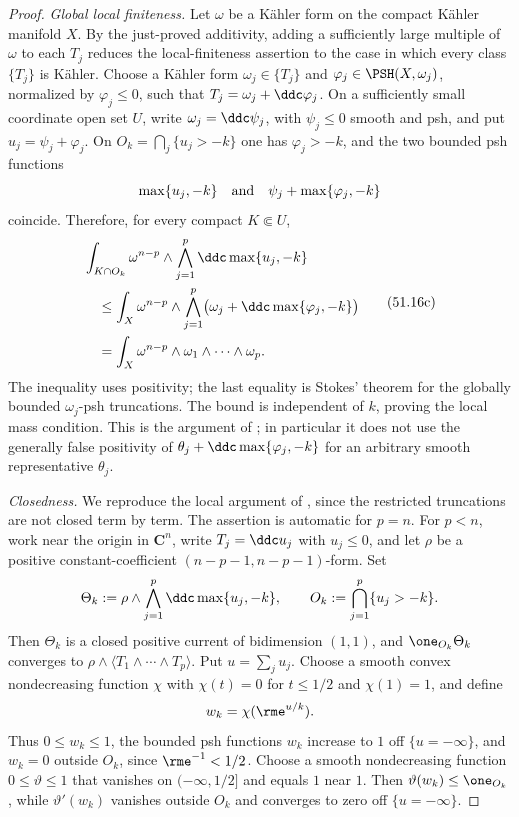 \begin{proof}
\emph{Global local finiteness.}
Let \(\omega\) be a K\"ahler form on the compact K\"ahler manifold \(X\).
By the just-proved additivity, adding a sufficiently large multiple of
\(\omega\) to each \(T_j\) reduces the local-finiteness assertion to the
case in which every class \(\{T_j\}\) is K\"ahler.  Choose a K\"ahler form
\(\omega_j\in\{T_j\}\) and
\(\varphi_j\in\PSH(X,\omega_j)\), normalized by \(\varphi_j\leq0\), such
that \(T_j=\omega_j+\ddc\varphi_j\).  On a sufficiently small coordinate
open set \(U\), write \(\omega_j=\ddc\psi_j\), with \(\psi_j\leq0\) smooth
and psh, and put \(u_j=\psi_j+\varphi_j\).  On
\(O_k=\bigcap_j\{u_j>-k\}\) one has \(\varphi_j>-k\), and the two bounded
psh functions
\[
       \max\{u_j,-k\}
       \quad\hbox{and}\quad
       \psi_j+\max\{\varphi_j,-k\}
\]
coincide.  Therefore, for every compact \(K\Subset U\),
\[
\begin{aligned}
 &\int_{K\cap O_k}\omega^{n-p}\wedge
       \bigwedge_{j=1}^p\ddc\max\{u_j,-k\}\\
 &\quad\leq
 \int_X\omega^{n-p}\wedge
       \bigwedge_{j=1}^p
          \bigl(\omega_j+\ddc\max\{\varphi_j,-k\}\bigr)\\
 &\quad=
 \int_X\omega^{n-p}\wedge\omega_1\wedge\cdots\wedge\omega_p.
\end{aligned}
\tag{51.16c}\label{eq:complex-npp-global-finiteness}
\]
The inequality uses positivity; the last equality is Stokes' theorem for
the globally bounded \(\omega_j\)-psh truncations.  The bound is independent
of \(k\), proving the local mass condition.  This is the argument of
\cite[Proposition~1.6]{BEGZ10}; in particular it does not use the generally
false positivity of
\(\theta_j+\ddc\max\{\varphi_j,-k\}\) for an arbitrary smooth
representative \(\theta_j\).

\emph{Closedness.}
We reproduce the local argument of \cite[Theorem~1.8]{BEGZ10}, since the
restricted truncations are not closed term by term.  The assertion is
automatic for \(p=n\).  For \(p<n\), work near the origin in
\(\mathbf C^n\), write \(T_j=\ddc u_j\) with \(u_j\leq0\), and let
\(\rho\) be a positive constant-coefficient
\((n-p-1,n-p-1)\)-form.  Set
\[
 \Theta_k:=\rho\wedge\bigwedge_{j=1}^p
                  \ddc\max\{u_j,-k\},
 \qquad O_k:=\bigcap_{j=1}^p\{u_j>-k\}.
\]
Then \(\Theta_k\) is a closed positive current of bidimension \((1,1)\),
and \(\one_{O_k}\Theta_k\) converges to
\(\rho\wedge\langle T_1\wedge\cdots\wedge T_p\rangle\).  Put
\(u=\sum_j u_j\).  Choose a smooth convex nondecreasing function \(\chi\)
with \(\chi(t)=0\) for \(t\leq1/2\) and \(\chi(1)=1\), and define
\[
                         w_k=\chi(\rme^{u/k}).
\]
Thus \(0\leq w_k\leq1\), the bounded psh functions \(w_k\) increase to
\(1\) off \(\{u=-\infty\}\), and \(w_k=0\) outside \(O_k\), since
\(\rme^{-1}<1/2\).  Choose a smooth nondecreasing function
\(0\leq\vartheta\leq1\) that vanishes on \((-\infty,1/2]\) and equals
\(1\) near \(1\).  Then
\(\vartheta(w_k)\leq\one_{O_k}\), while
\(\vartheta'(w_k)\) vanishes outside \(O_k\) and converges to zero off
\(\{u=-\infty\}\).


\end{proof}
